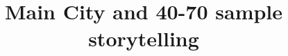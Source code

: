 \documentclass{article}
\title{Main City and 40-70 sample storytelling}
\begin{document}
\maketitle

{\footnotesize }
\begin{landscape}
\clearpage

\clearpage


\clearpage

\clearpage


\clearpage

\clearpage

\clearpage

\clearpage

\clearpage

\clearpage

\clearpage


\end{landscape}
\end{document}
